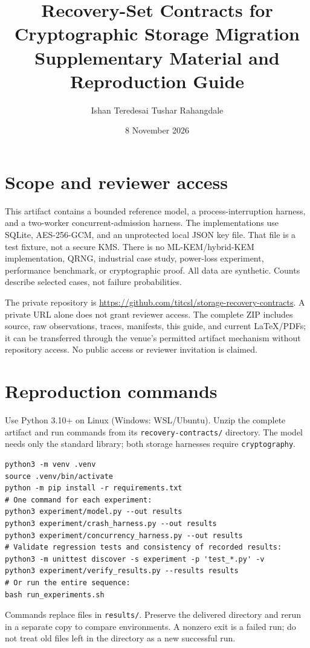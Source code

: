 \documentclass[10pt]{article}
\title{Recovery-Set Contracts for Cryptographic Storage Migration\\\large Supplementary Material and Reproduction Guide}
\author{Ishan Teredesai \qquad Tushar Rahangdale}
\date{8 November 2026}
\begin{document}
\maketitle
\section{Scope and reviewer access}
This artifact contains a bounded reference model, a process-interruption harness,
and a two-worker concurrent-admission harness. The implementations use SQLite,
AES-256-GCM, and an unprotected local JSON key file. That file is a test fixture,
not a secure KMS. There is no ML-KEM/hybrid-KEM implementation, QRNG, industrial
case study, power-loss experiment, performance benchmark, or cryptographic proof.
All data are synthetic. Counts describe selected cases, not failure probabilities.

The private repository is \url{https://github.com/titcsl/storage-recovery-contracts}.
A private URL alone does not grant reviewer access. The complete ZIP includes
source, raw observations, traces, manifests, this guide, and current LaTeX/PDFs;
it can be transferred through the venue's permitted artifact mechanism without
repository access. No public access or reviewer invitation is claimed.

\section{Reproduction commands}
Use Python 3.10+ on Linux (Windows: WSL/Ubuntu). Unzip the complete artifact and
run commands from its \texttt{recovery-contracts/} directory. The model needs
only the standard library; both storage harnesses require \texttt{cryptography}.
\begin{Verbatim}[fontsize=\small]
python3 -m venv .venv
source .venv/bin/activate
python -m pip install -r requirements.txt
# One command for each experiment:
python3 experiment/model.py --out results
python3 experiment/crash_harness.py --out results
python3 experiment/concurrency_harness.py --out results
# Validate regression tests and consistency of recorded results:
python3 -m unittest discover -s experiment -p 'test_*.py' -v
python3 experiment/verify_results.py --results results
# Or run the entire sequence:
bash run_experiments.sh
\end{Verbatim}
Commands replace files in \texttt{results/}. Preserve the delivered directory
and rerun in a separate copy to compare environments. A nonzero exit is a failed
run; do not treat old files left in the directory as a new successful run.
\end{document}
